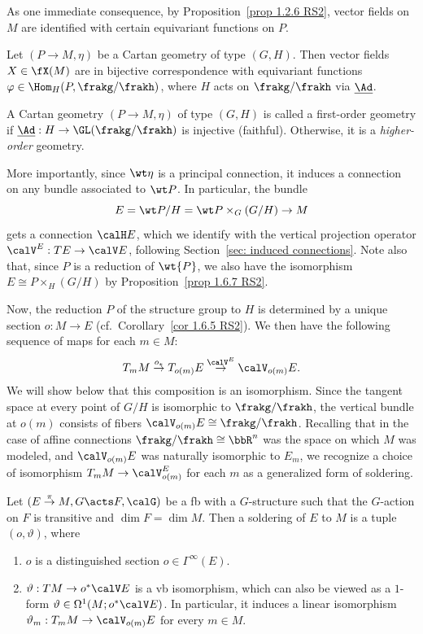 As one immediate consequence, by Proposition~\ref{prop 1.2.6 RS2}, vector fields on $M$ are identified with certain equivariant functions on $P$.
\begin{cor}
    Let $(P\to M,\eta)$ be a Cartan geometry of type $(G,H)$. Then vector fields $X\in \fX(M)$ are in bijective correspondence with equivariant functions $\varphi\in\Hom_H(P,\frakg\slash\frakh)$, where $H$ acts on $\frakg\slash\frakh$ via $\underline{\Ad}$.
\end{cor}

\begin{defn}
    A Cartan geometry $(P\to M,\eta)$ of type $(G,H)$ is called a first-order geometry if $\underline{\Ad}:H\to \GL(\frakg\slash\frakh)$ is injective (faithful). Otherwise, it is a \emph{higher-order} geometry.
\end{defn}

More importantly, since $\wt\eta$ is a principal connection, it induces a connection on any bundle associated to $\wt P$. In particular, the bundle 
\[E=\wt P\slash H=\wt P\times_G (G\slash H)\to M\] gets a connection $\calH E$, which we identify with the vertical projection operator $\calV^E:TE\to \calV E$, following Section~\ref{sec: induced connections}. 
Note also that, since $P$ is a reduction of $\wt{P}$, we also have the isomorphism $E\cong P\times_H (G\slash H)$ by Proposition~\ref{prop 1.6.7 RS2}.

Now, the reduction $P$ of the structure group to $H$ is determined by a unique section $o:M\to E$ (cf.\ Corollary~\ref{cor 1.6.5 RS2}). We then have the following sequence of maps for each $m\in M$:
\[T_mM\overset{o_{\ast}}{\to}T_{o(m)}E\overset{\calV^E}{\to}\calV_{o(m)}E.\]
We will show below that this composition is an isomorphism. Since the tangent space at every point of $G\slash H$ is isomorphic to $\frakg\slash\frakh$, the vertical bundle at $o(m)$ consists of fibers $\calV_{o(m)}E\cong \frakg\slash\frakh$.  Recalling that in the case of affine connections $\frakg\slash\frakh\cong\bbR^n$ was the space on which $M$ was modeled, and $\calV_{o(m)}E$ was naturally isomorphic to $E_m$, we recognize a choice of isomorphism $T_mM\to \calV^E_{o(m)}$ for each $m$ as a generalized form of soldering.

\begin{defn}\label{def soldering of E to M}
    Let $(E\overset{\pi}{\to}M,G\acts F,\calG)$ be a \gls{fb} with a $G$-structure such that the $G$-action on $F$ is transitive and $\dim F=\dim M$. Then a soldering of $E$ to $M$ is a tuple $(o,\vartheta)$, where
    \begin{enumerate}
        \item $o$ is a distinguished section $o\in\Gamma^\infty(E)$.
        \item $\vartheta:TM\to o^\ast\calV E$ is a \gls{vb} isomorphism, which can also be viewed as a $1$-form $\vartheta\in \Omega^1(M;o^\ast \calV E)$. In particular, it induces a linear isomorphism $\vartheta_m:T_m M\to \calV_{o(m)}E$ for every $m\in M$.
    \end{enumerate}
\end{defn}

